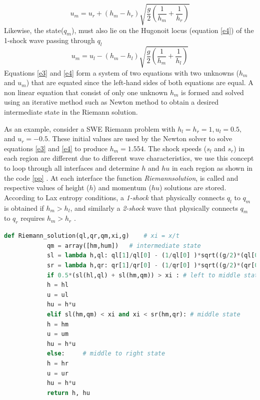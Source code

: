 \documentclass[12pt,a4paper]{article}
\begin{document}
{	\begin{equation}
		u_{m} = u_{r} + (h_{m} - h_{r})\sqrt{\frac{g}{2}\left(\frac{1}{h_m} + \frac{1}{h_r} \right)}
		\label{e3}
	\end{equation}
	Likewise, the state($q_m$), must also lie on the Hugonoit locus (equation \eqref{e4}) of the 1-shock wave passing through $q_l$
	\begin{equation}
		u_{m} = u_{l} - (h_{m} - h_{l})\sqrt{\frac{g}{2}\left(\frac{1}{h_m} + \frac{1}{h_l} \right)}
		\label{e4}
	\end{equation}
	Equations \eqref{e3} and \eqref{e4} form a system of two equations with two unknowns ($h_m$ and $u_m$) that are equated since the left-hand sides of both equations are equal. A non linear equation that consist of only one unknown $h_m$ is formed and solved using an iterative method such as Newton method to obtain a desired intermediate state in the Riemann solution\cite{le-ge-be:2011}.
	
	As an example, consider a SWE Riemann problem with $h_l = h_r = 1, u_l = 0.5, $ and $u_r = -0.5$. These initial values are used by the Newton solver to solve equations \eqref{e3} and \eqref{e4} to produce $h_{m} = 1.554$. The shock speeds ($s_l$ and $s_r$) in each region are different due to different wave characteristics, we use this concept to loop through all interfaces and determine $h$ and $hu$ in each region as shown in the code \ref{pp} . At each interface the function {\em Riemann\textunderscore solution}, is called and respective values of   height ($h$) and momentum  ($hu$) solutions are stored. According to Lax entropy conditions, a  {\em 1-shock} that physically connects $q_l$ to $q_m$ is obtained if $h_m>h_l$, and similarly a {\em 2-shock} wave that physically connects $q_m$ to $q_r$ requires $h_m>h_r$ \cite{le-ge-be:2011}.
	
	\begin{small}
		\begin{lstlisting}[language=Python, caption=Python code describing how the two shock case solution is obtained after the first time step.,label = pp]
			def Riemann_solution(ql,qr,qm,xi,g)    # xi = x/t
			qm = array([hm,hum])   # intermediate state
			sl = lambda h,ql: ql[1]/ql[0] - (1/ql[0] )*sqrt((g/2)*(ql[0]*h*(ql[0]+h)))
			sr = lambda h,qr: qr[1]/qr[0] - (1/qr[0] )*sqrt((g/2)*(qr[0]*h*(qr[0]+h))) 
			if 0.5*(sl(hl,ql) + sl(hm,qm)) > xi : # left to middle state
			h = hl
			u = ul
			hu = h*u   	
			elif sl(hm,qm) < xi and xi < sr(hm,qr): # middle state
			h = hm
			u = um
			hu = h*u
			else:     # middle to right state
			h = hr
			u = ur
			hu = h*u
			return h, hu
		\end{lstlisting}
	\end{small}
	
}
\end{document}

